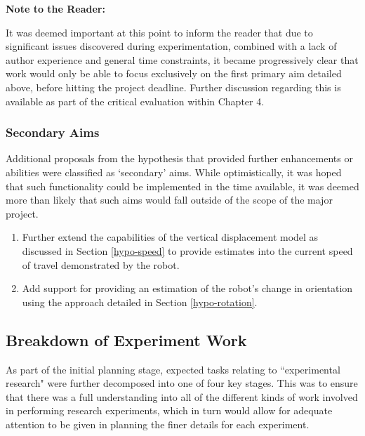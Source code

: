 \textbf{Note to the Reader:} 

It was deemed important at this point to inform the reader that due to significant issues discovered during experimentation, combined with a lack of author experience and general time constraints, it became progressively clear that work would only be able to focus exclusively on the first primary aim detailed above, before hitting the project deadline. Further discussion regarding this is available as part of the critical evaluation within Chapter 4.

\subsubsection{Secondary Aims}

Additional proposals from the hypothesis that provided further enhancements or abilities were classified as `secondary' aims. While optimistically, it was hoped that such functionality could be implemented in the time available, it was deemed more than likely that such aims would fall outside of the scope of the major project.

\begin{enumerate}
	 \item Further extend the capabilities of the vertical displacement model as discussed in Section \ref{hypo-speed} to provide estimates into the current speed of travel demonstrated by the robot.
	 \item Add support for providing an estimation of the robot's change in orientation using the approach detailed in Section \ref{hypo-rotation}.
\end{enumerate}

\subsection{Breakdown of Experiment Work}

As part of the initial planning stage, expected tasks relating to ``experimental research" were further decomposed into one of four key stages. This was to ensure that there was a full understanding into all of the different kinds of work involved in performing research experiments, which in turn would allow for adequate attention to be given in planning the finer details for each experiment. 

